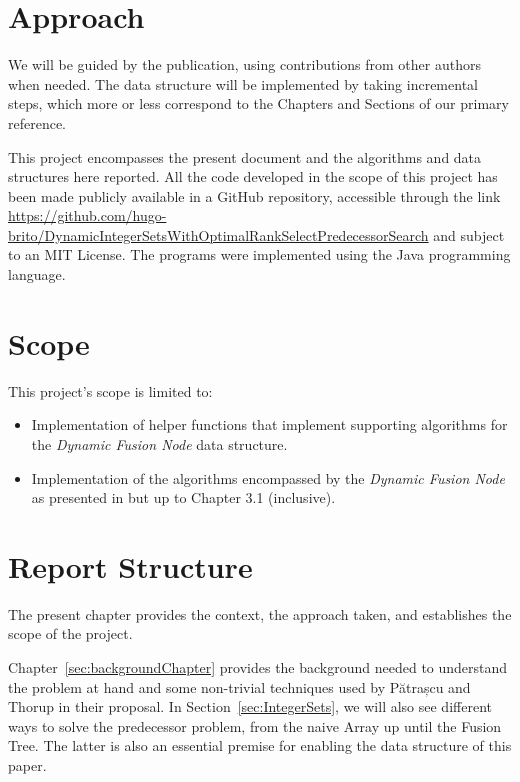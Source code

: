 \section{Approach} %

We will be guided by the \cite{patrascu2014dynamic} publication, using contributions from other authors when needed. The data structure will be implemented by taking incremental steps, which more or less correspond to the Chapters and Sections of our primary reference.

This project encompasses the present document and the algorithms and data structures here reported. All the code developed in the scope of this project has been made publicly available in a GitHub repository, accessible through the link \url{https://github.com/hugo-brito/DynamicIntegerSetsWithOptimalRankSelectPredecessorSearch} and subject to an MIT License.
The programs were implemented using the Java programming language.

\section{Scope} \label{sec:scope}

This project's scope is limited to:
\begin{itemize}
    \item
    Implementation of helper functions that implement supporting algorithms for the \textit{Dynamic Fusion Node} data structure.
    
    \item
    Implementation of the algorithms encompassed by the \textit{Dynamic Fusion Node} as presented in \cite{patrascu2014dynamic} but up to Chapter 3.1 (inclusive).
\end{itemize}

\section{Report Structure}

The present chapter provides the context, the approach taken, and establishes the scope of the project.

Chapter~\ref{sec:backgroundChapter} provides the background needed to understand the problem at hand and some non-trivial techniques used by Pătrașcu and Thorup in their proposal.
In Section~\ref{sec:IntegerSets}, we will also see different ways to solve the predecessor problem, from the naive Array up until the Fusion Tree.
The latter is also an essential premise for enabling the data structure of this paper.

